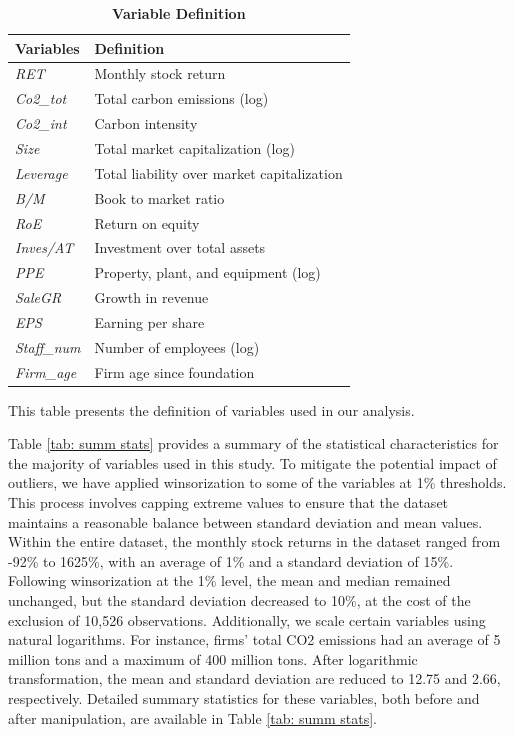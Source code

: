 \documentclass[12pt]{article}
\begin{document}
\begin{table}[!ht]
\footnotesize
\centering
\caption{\textbf{Variable Definition}}
\label{tab: var def}
\begin{tabular}{ll}
\toprule
Variables & Definition \\ \hline

\textit{RET} & Monthly stock return \\
\textit{Co2\_tot} & Total carbon emissions (log) \\
\textit{Co2\_int} & Carbon intensity \\
\textit{Size} & Total market capitalization (log) \\
\textit{Leverage} & Total liability over market capitalization \\
\textit{B/M} & Book to market ratio \\
\textit{RoE} & Return on equity \\
\textit{Inves/AT} & Investment over total assets \\
\textit{PPE} & Property, plant, and equipment (log) \\
\textit{SaleGR} & Growth in revenue \\
\textit{EPS} & Earning per share \\
\textit{Staff\_num} & Number of employees (log) \\
\textit{Firm\_age} & Firm age since foundation\\
  
\bottomrule
\end{tabular}
\begin{tablenotes}
\footnotesize
\item This table presents the definition of variables used in our analysis.
\end{tablenotes}
\end{table}

Table \ref{tab: summ stats} provides a summary of the statistical characteristics for the majority of variables used in this study. To mitigate the potential impact of outliers, we have applied winsorization to some of the variables at 1\% thresholds. This process involves capping extreme values to ensure that the dataset maintains a reasonable balance between standard deviation and mean values. Within the entire dataset, the monthly stock returns in the dataset ranged from -92\% to 1625\%, with an average of 1\% and a standard deviation of 15\%. Following winsorization at the 1\% level, the mean and median remained unchanged, but the standard deviation decreased to 10\%, at the cost of the exclusion of 10,526 observations. Additionally, we scale certain variables using natural logarithms. For instance, firms' total CO2 emissions had an average of 5 million tons and a maximum of 400 million tons. After logarithmic transformation, the mean and standard deviation are reduced to 12.75 and 2.66, respectively. Detailed summary statistics for these variables, both before and after manipulation, are available in Table \ref{tab: summ stats}.
\end{document}

